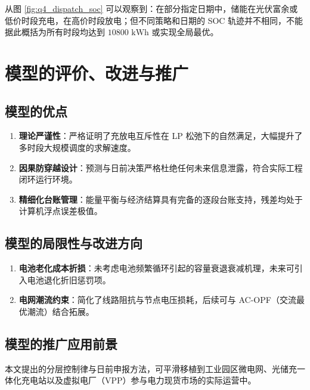 \documentclass[withoutpreface]{cumcmthesis}
\begin{document}
从图 \ref{fig:q4_dispatch_soc} 可以观察到：在部分指定日期中，储能在光伏富余或低价时段充电，在高价时段放电；但不同策略和日期的 SOC 轨迹并不相同，不能据此概括为所有时段均达到 $10800\text{ kWh}$ 或实现全局最优。
\section{模型的评价、改进与推广}

\subsection{模型的优点}
\begin{enumerate}
    \item \textbf{理论严谨性}：严格证明了充放电互斥性在 LP 松弛下的自然满足，大幅提升了多时段大规模调度的求解速度。
    \item \textbf{因果防穿越设计}：预测与日前决策严格杜绝任何未来信息泄露，符合实际工程闭环运行环境。
    \item \textbf{精细化台账管理}：能量平衡与经济结算具有完备的逐段台账支持，残差均处于计算机浮点误差极值。
\end{enumerate}

\subsection{模型的局限性与改进方向}
\begin{enumerate}
    \item \textbf{电池老化成本折损}：未考虑电池频繁循环引起的容量衰退衰减机理，未来可引入电池退化折旧惩罚项。
    \item \textbf{电网潮流约束}：简化了线路阻抗与节点电压损耗，后续可与 AC-OPF（交流最优潮流）结合拓展。
\end{enumerate}

\subsection{模型的推广应用前景}
本文提出的分层控制律与日前申报方法，可平滑移植到工业园区微电网、光储充一体化充电站以及虚拟电厂（VPP）参与电力现货市场的实际运营中。


\end{document}

